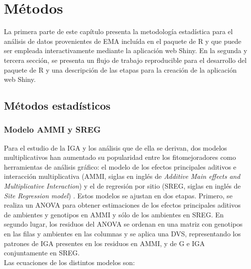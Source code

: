 
\chapter{Métodos}

La primera parte de este capítulo presenta la metodología estadística para el análisis de datos provenientes de EMA incluída en el paquete de R y que puede ser empleada interactivamente mediante la aplicación web Shiny. En la segunda y tercera sección, se presenta un flujo de trabajo reproducible para el desarrollo del paquete de R y una descripción de las etapas para la creación de la aplicación web Shiny.


\section{Métodos estadísticos}

\subsection{Modelo AMMI y SREG}
Para el estudio de la IGA y los análisis que de ella se derivan, dos modelos multiplicativos han aumentado su popularidad entre los fitomejoradores como herramientas de análisis gráfico: el modelo de los efectos principales aditivos e interacción multiplicativa (AMMI, siglas en inglés de \emph{Additive Main effects and Multiplicative Interaction}) \citep{Gauch1988, Gauch1992} y el de regresión por sitio (SREG, siglas en inglés de \emph{Site Regression model}) \citep{Corneliusetal1996, CrossaCornelius1997}. Estos modelos se ajustan en dos etapas. Primero, se realiza un ANOVA para obtener estimaciones de los efectos principales aditivos de ambientes y genotipos en AMMI y sólo de los ambientes en SREG. En segundo lugar, los residuos del ANOVA se ordenan en una matriz con genotipos en las filas y ambientes en las columnas y se aplica una DVS, representando los patrones de IGA presentes en los residuos en AMMI, y de G e IGA conjuntamente en SREG.\\

Las ecuaciones de los distintos modelos son:

